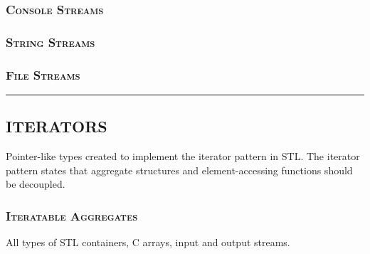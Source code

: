 \documentclass[10pt]{article}
\begin{document}
\begin{multicols*}{5}
{\subsubsection*{\textsc{Console Streams}} 
\blindtext


\subsubsection*{\textsc{String Streams}} 
\blindtext


\subsubsection*{\textsc{File Streams}} 
\blindtext


}

\par\noindent\rule{155pt}{0.4pt}

{\color{Blue}
\subsection*{ITERATORS}	
\noindent
Pointer-like types created to implement the iterator pattern in STL. The iterator pattern states that aggregate structures and element-accessing functions should be decoupled.

\subsubsection*{\textsc{Iteratable Aggregates}} 
\noindent
All types of STL containers, C arrays, input and output streams.

}
\end{multicols*}
\end{document}
